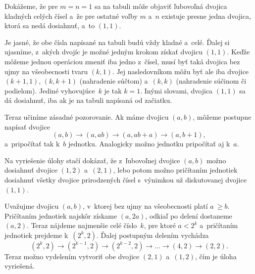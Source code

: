 {%
Dokážeme, že pre $m=n=1$ sa na tabuli môže objaviť ľubovoľná dvojica
kladných celých čísel a~že pre ostatné voľby $m$ a~$n$ existuje presne
jedna dvojica, ktorá sa nedá dosiahnuť, a~to $(1, 1)$.

\medskip
Je jasné, že obe čísla napísané na tabuli budú vždy kladné
a~celé.
Ďalej si ujasníme, z~akých dvojíc je možné jedným krokom získať dvojicu
$(1, 1)$. Keďže môžeme jednou operáciou zmeniť iba jedno z~čísel, musí byť
taká dvojica bez ujmy na všeobecnosti tvaru $(k, 1)$. Jej
nasledovníkom môžu byť ale iba dvojice $(k+1, 1)$, $(k, k+1)$
(nahradenie súčtom) a~$(k, k)$ (nahradenie súčinom či podielom). Jediné
vyhovujúce~$k$ je tak $k=1$. Inými slovami, dvojica $(1, 1)$ sa dá
dosiahnuť, iba ak je na tabuli napísaná od začiatku.

Teraz učiníme zásadné pozorovanie. Ak máme dvojicu $(a,b)$, môžeme
postupne napísať dvojice
$$
(a,b)\to(a,ab)\to(a,ab+a)\to(a,b+1),
$$
a~pripočítať tak k~$b$ jednotku. Analogicky možno jednotku pripočítať aj k~$a$.

Na vyriešenie úlohy stačí dokázať, že z~ľubovoľnej dvojice $(a,b)$ možno
dosiahnuť dvojice $(1, 2)$ a~$(2, 1)$, lebo potom možno pričítaním
jednotiek dosiahnuť všetky dvojice prirodzených čísel
s~výnimkou už diskutovanej dvojice $(1, 1)$.

Uvažujme dvojicu $(a, b)$, v~ktorej bez ujmy na všeobecnosti platí $a~\ge b$.
Pričítaním jednotiek najskôr získame $(a, 2a)$, odkiaľ po delení dostaneme
$(a, 2)$. Teraz nájdeme najmenšie celé číslo~$k$, pre ktoré $a<2^k$
a~pričítaním jednotiek prejdeme k~$(2^k,2)$. Ďalej postupným delením
vychádza
$$
(2^k, 2) \to (2^{k-1},2)\to(2^{k-2},2)\to \dots\to(4,2)\to(2,2).
$$
Teraz možno vydelením vytvoriť obe dvojice $(2, 1)$ a~$(1, 2)$, čím je
úloha vyriešená.
}

